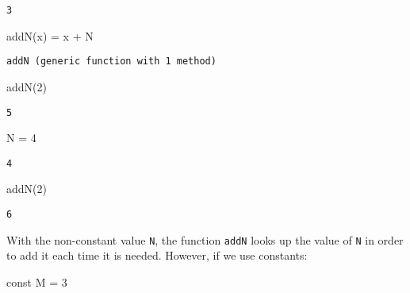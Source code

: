 \documentclass[
  letterpaper,
  DIV=11,
  numbers=noendperiod]{scrreprt}
\newenvironment{Shaded}{\begin{snugshade}}{\end{snugshade}}
\newcommand{\FloatTok}[1]{\textcolor[rgb]{0.68,0.00,0.00}{#1}}
\newcommand{\FunctionTok}[1]{\textcolor[rgb]{0.28,0.35,0.67}{#1}}
\newcommand{\KeywordTok}[1]{\textcolor[rgb]{0.00,0.23,0.31}{#1}}
\newcommand{\NormalTok}[1]{\textcolor[rgb]{0.00,0.23,0.31}{#1}}
\newcommand{\OperatorTok}[1]{\textcolor[rgb]{0.37,0.37,0.37}{#1}}
\begin{document}
\begin{verbatim}
3
\end{verbatim}

\begin{Shaded}
\begin{Highlighting}[]
\FunctionTok{addN}\NormalTok{(x) }\OperatorTok{=}\NormalTok{ x }\OperatorTok{+}\NormalTok{ N}
\end{Highlighting}
\end{Shaded}

\begin{verbatim}
addN (generic function with 1 method)
\end{verbatim}

\begin{Shaded}
\begin{Highlighting}[]
\FunctionTok{addN}\NormalTok{(}\FloatTok{2}\NormalTok{)}
\end{Highlighting}
\end{Shaded}

\begin{verbatim}
5
\end{verbatim}

\begin{Shaded}
\begin{Highlighting}[]
\NormalTok{N }\OperatorTok{=} \FloatTok{4}
\end{Highlighting}
\end{Shaded}

\begin{verbatim}
4
\end{verbatim}

\begin{Shaded}
\begin{Highlighting}[]
\FunctionTok{addN}\NormalTok{(}\FloatTok{2}\NormalTok{)}
\end{Highlighting}
\end{Shaded}

\begin{verbatim}
6
\end{verbatim}

With the non-constant value \texttt{N}, the function \texttt{addN} looks
up the value of \texttt{N} in order to add it each time it is needed.
However, if we use constants:

\begin{Shaded}
\begin{Highlighting}[]
\KeywordTok{const}\NormalTok{ M }\OperatorTok{=} \FloatTok{3}
\end{Highlighting}
\end{Shaded}
\end{document}
